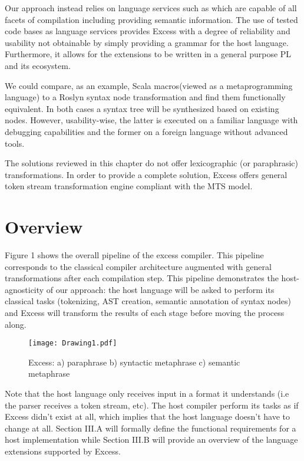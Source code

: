 \documentclass[conference]{IEEEtran}
\begin{document}
Our approach instead relies on language services such as \cite{Roslyn} which are capable of all facets of compilation including providing semantic information. The use of tested code bases as language services provides Excess with a degree of reliability and usability not obtainable by simply providing a grammar for the host language. Furthermore, it allows for the extensions to be written in a general purpose PL and its ecosystem. 

We could compare, as an example, Scala macros(viewed as a metaprogramming language) to a Roslyn \cite{Roslyn} syntax node transformation and find them functionally equivalent. In both cases a syntax tree will be synthesized based on existing nodes. However, usability-wise, the latter is executed on a familiar language with debugging capabilities and the former on a foreign language without advanced tools.

The solutions reviewed in this chapter do not offer lexicographic (or paraphrasic) transformations. In order to provide a complete solution, Excess offers general token stream transformation engine compliant with the MTS model. 

\section{Overview}

Figure 1 shows the overall pipeline of the excess compiler. This pipeline corresponds to the classical compiler architecture augmented with general transformations after each compilation step. This pipeline demonstrates the host-agnosticity of our approach: the host language will be asked to perform its classical tasks (tokenizing, AST creation, semantic annotation of syntax nodes) and Excess will transform the results of each stage before moving the process along.

\begin{figure}
\texttt{[image: Drawing1.pdf]}
\caption{Excess: a) paraphrase b) syntactic metaphrase c) semantic metaphrase}
\label{fig_sim}
\end{figure}

Note that the host language only receives input in a format it understands (i.e the parser receives a token stream, etc). The host compiler perform its tasks as if Excess didn't exist at all, which implies that the host language doesn't have to change at all.
Section III.A will formally define the functional requirements for a host implementation while Section III.B will provide an overview of the language extensions supported by Excess.
\end{document}
